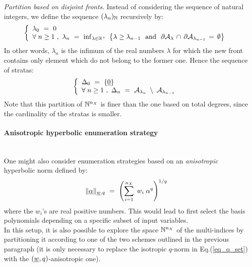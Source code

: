 {\textit{Partition based on disjoint fronts. } Instead of considering the sequence of natural integers, we define the sequence $(\lambda_n)_{{\mathbb N}}$ recursively by:
\begin{equation}
  \left\{
  \begin{array}{l}
    \lambda_0 \, \, = \, \, 0 \\
    \forall \; n  \geq  1 \, \, , \, \, \lambda_n \, \, = \, \,
    \inf_{\lambda \in {\mathbb R}^+} \; \left\{ \lambda \geq \lambda_{n-1} \, \, \mbox{ and } \, \,\partial {\mathcal A}_{\lambda} \, \cap \, \partial {\mathcal A}_{\lambda_{n-1}} \, = \, \emptyset \right\}
  \end{array}
  \right.
\end{equation}
In other words, $\lambda_n$ is the infimum of the real numbers $\lambda$ for which the new front contains only element which do not belong to the former one. Hence the sequence of stratas:
\begin{equation}
  \left\{
  \begin{array}{l}
    \Delta_0 \, \, = \, \, \{{\underline{0}}\} \\
    \forall \; n  \geq  1 \, \, , \, \, \Delta_n \, \, = \, \, {\mathcal A}_{\lambda_n} \; \setminus \; {\mathcal A}_{\lambda_{n-1}} \\
  \end{array}
  \right.
\end{equation}
Note that this partition of ${\mathbb N}^{n_X}$ is finer than the one based on total degrees, since the cardinality of the stratas is smaller.

\paragraph*{Anisotropic hyperbolic enumeration strategy \\ \\}

One might also consider enumeration strategies based on an \emph{anisotropic} hyperbolic norm defined by:
\begin{equation}
  \|\underline{\alpha}\|_{{\underline{w}},q} \, \, = \, \, \left(\sum_{i=1}^{n_X} \; w_i\; \alpha^q \right)^{1/q}
\end{equation}
where the $w_i$'s are real positive numbers. This would lead to first select the basis polynomials depending on a specific subset of input variables. \\

In this setup, it is also possible to explore the space ${\mathbb N}^{n_X}$ of the multi-indices by partitioning it according to one of the two schemes outlined in the previous paragraph (it is only necessary to replace the isotropic $q$-norm in Eq.(\ref{eq_q_set}) with the $({\underline{w}},q)$-anisotropic one). \\

}
